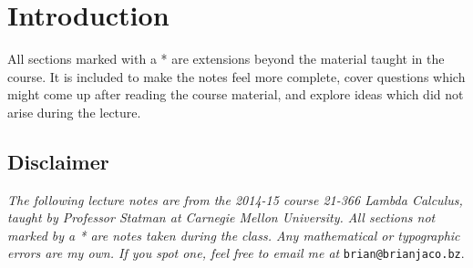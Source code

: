 \chapter*{\color{black}Introduction}
All sections marked with a * are extensions beyond the material taught in the course. It is included to make the notes feel more complete, cover questions which might come up after reading the course material, and explore ideas which did not arise during the lecture.


\section*{\color{black}Disclaimer}
\textit{The following lecture notes are from the 2014-15 course 21-366 Lambda Calculus, taught by Professor Statman at Carnegie Mellon University. All sections not marked by a * are notes taken during the class. Any mathematical or typographic errors are my own. If you spot one, feel free to email me at} \texttt{brian@brianjaco.bz}.
